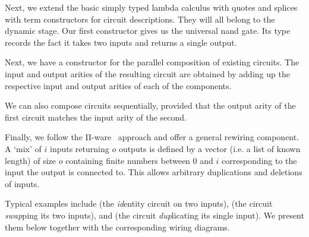 
Next, we extend the basic simply typed lambda calculus with
quotes and splices with term constructors for circuit descriptions.
They will all belong to the dynamic stage.
%
Our first constructor gives us the universal nand gate.
Its type records the fact it takes two inputs and returns
a single output.


Next, we have a constructor for the parallel composition
of existing circuits. The input and output arities of the
resulting circuit are obtained by adding up the respective
input and output arities of each of the components.


We can also compose circuits sequentially, provided
that the output arity of the first circuit matches
the input arity of the second.


Finally, we follow the Π-ware~\cite{DBLP:conf/types/FlorSS15}
approach and offer a general rewiring component.
A `mix' of $i$ inputs returning $o$ outputs is defined by
a vector (i.e. a list of known length) of size $o$
containing finite numbers between $0$ and $i$
corresponding to the input the output is connected to.
%
This allows arbitrary duplications and deletions
of inputs.


Typical examples include
 (the \emph{id}entity circuit on two inputs),
 (the circuit \emph{swap}ping its two inputs),
and  (the circuit \emph{dup}licating its single input).
We present them below together with the corresponding wiring diagrams.

\noindent
\begin{minipage}{.25\textwidth}
\end{minipage}\hfill
\begin{minipage}{.125\textwidth}
\end{minipage}

